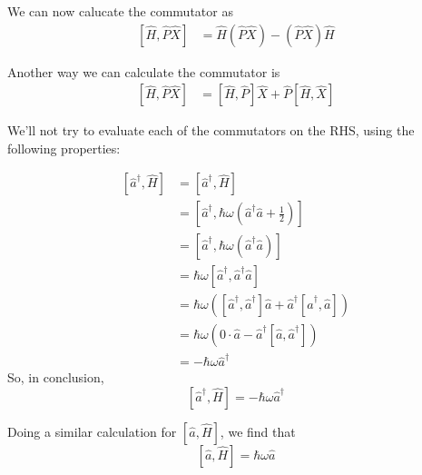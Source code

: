 \documentclass[twoside]{article}
\begin{document}
\begin{enumerate}
   We can now calucate the commutator as 
   \begin{align*}
      \left[\hat{H}, \hat{P}\hat{X} \right] &= \hat{H}\left( \hat{P}\hat{X} \right) - \left( \hat{P}\hat{X} \right)\hat{H} 
   \end{align*} 

   Another way we can calculate the commutator is 
   \begin{align*}
      \left[ \hat{H}, \hat{P}\hat{X} \right] &= \left[ \hat{H}, \hat{P}\right]\hat{X} + \hat{P}\left[ \hat{H}, \hat{X}  \right]
   \end{align*}

   \vskip 1cm

   We'll not try to evaluate each of the commutators on the RHS, using the following properties:
   
   \begin{align*}
      \left[ \hat{a}^{\dagger}, \hat{H} \right] &= \left[ \hat{a}^{\dagger}, \hat{H} \right] \\
      &= \left[ \hat{a}^{\dagger}, \hbar\omega\left(\hat{a}^{\dagger}\hat{a} + \frac{1}{2}\right) \right] \\
      &= \left[ \hat{a}^{\dagger}, \hbar\omega\left(\hat{a}^{\dagger}\hat{a} \right) \right] \\
      &= \hbar\omega\left[ \hat{a}^{\dagger}, \hat{a}^{\dagger}\hat{a} \right] \\
      &= \hbar\omega (\left[\hat{a}^{\dagger}, \hat{a}^{\dagger} \right]\hat{a} + \hat{a}^{\dagger}\left[ \hat{a}^{\dagger}, \hat{a}\right]) \\
      &= \hbar\omega (0 \cdot \hat{a} - \hat{a}^{\dagger}\left[ \hat{a}, \hat{a}^{\dagger}\right]) \\
      &= -\hbar\omega \hat{a}^{\dagger}
   \end{align*}
   So, in conclusion, 
   \[ \boxed{\left[ \hat{a}^{\dagger}, \hat{H} \right] = -\hbar\omega \hat{a}^{\dagger}} \]

   Doing a similar calculation for $\left[ \hat{a}, \hat{H} \right]$, we find that 
   \[ \boxed{\left[ \hat{a}, \hat{H} \right] = \hbar\omega \hat{a}} \]
   \vskip 2cm


\end{enumerate}
\end{document}
